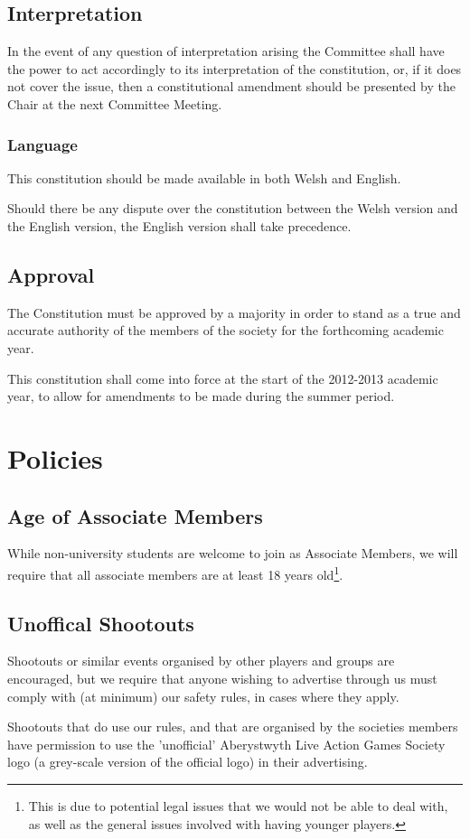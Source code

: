\documentclass{report}
\newcommand{\society}{Aberystwyth Live Action Games Society}
\begin{document}
\section{Interpretation}

In the event of any question of interpretation arising the Committee shall have the power to act accordingly to its interpretation of the constitution, or, if it does not cover the issue, then a constitutional amendment should be presented by the Chair at the next Committee Meeting.

	\subsection{Language}
	
	This constitution should be made available in both Welsh and English.
	
	Should there be any dispute over the constitution between the Welsh version and the English version, the English version shall take precedence.

\section{Approval}

The Constitution must be approved by a majority in order to stand as a true and accurate authority of the members of the society for the forthcoming academic year.

This constitution shall come into force at the start of the 2012-2013 academic year, to allow for amendments to be made during the summer period.

\appendix
\chapter{Policies}
\label{policy}

\section{Age of Associate Members}

While non-university students are welcome to join as Associate Members, we will require that all associate members are at least 18 years old\footnote{This is due to potential legal issues that we would not be able to deal with, as well as the general issues involved with having younger players.}.

\section{Unoffical Shootouts}

Shootouts or similar events organised by other players and groups are encouraged, but we require that anyone wishing to advertise through us must comply with (at minimum) our safety rules, in cases where they apply.

Shootouts that do use our rules, and that are organised by the societies members have permission to use the 'unofficial' \society{} logo (a grey-scale version of the official logo) in their advertising.
\end{document}
